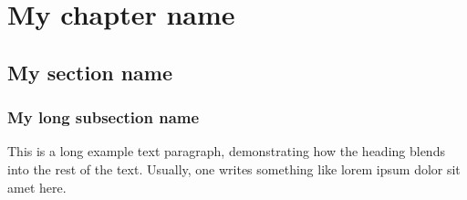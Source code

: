 \documentclass[11pt]{report}
\begin{document}
\titlespacing{\subsection}{5cm}{8pt}{\wordsep}

\chapter{My chapter name}
\section{My section name}
\subsection{My long subsection name}
This is a long example text paragraph,
demonstrating how the heading blends into the rest of the text.
Usually, one writes something like lorem ipsum dolor sit amet here.
\end{document}
